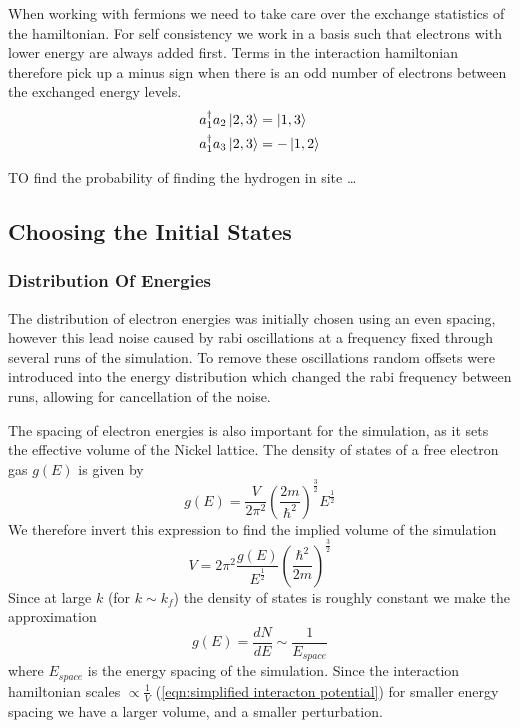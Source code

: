 When working with
fermions we need to take
care over the exchange
statistics of the hamiltonian.
For self consistency we work in
a basis such that electrons
with lower energy are always
added first. Terms in the interaction
hamiltonian therefore pick
up a minus sign when there is
an odd number of electrons
between the exchanged energy levels.
\begin{align}
    a^\dagger_1a_2 \ket{2,3} & = \ket{1,3}  \\
    a^\dagger_1a_3 \ket{2,3} & = -\ket{1,2}
\end{align}

TO find the probability
of finding the hydrogen in site \ldots

\subsection{Choosing the Initial States}

\subsubsection{Distribution Of Energies}
The distribution of electron energies was
initially chosen using an even spacing,
however this lead noise caused
by rabi oscillations
at a frequency
fixed through several runs
of the simulation.
To remove these oscillations
random offsets were introduced
into the energy distribution
which changed the rabi frequency
between runs,
allowing for cancellation
of the noise.

The spacing of electron energies is also
important for the simulation, as it
sets the effective volume of the Nickel
lattice. The density of states of a free electron
gas \(g(E)\) is given by~\cite{KittelCharles1953Itss}
\begin{equation}
    g(E) = \frac{V}{2\pi^2}
    {(\frac{2m}{\hbar^2})}^{\frac{3}{2}}
    E^{\frac{1}{2}}
\end{equation}
We therefore invert this expression
to find the implied volume of the
simulation
\begin{equation}
    V = 2\pi^2
    \frac{g(E)}{E^{\frac{1}{2}}}
    {(\frac{\hbar^2}{2m})}^{\frac{3}{2}}
\end{equation}
Since at large \(k\)
(for \(k\sim k_f\))
the density of states is roughly
constant we make the approximation
\begin{equation}
    g(E) = \frac{dN}{dE} \sim \frac{1}{E_{space}}
\end{equation}
where \(E_{space}\) is the energy spacing
of the simulation.
Since the interaction
hamiltonian scales
\(\propto \frac{1}{V}\)
(\cref{eqn:simplified interacton potential})
for smaller
energy spacing we have
a larger volume, and a smaller
perturbation.

